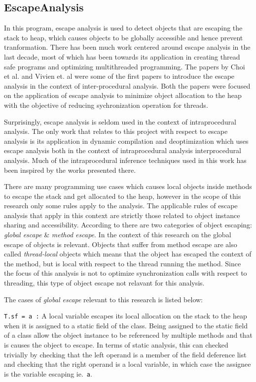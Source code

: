 \subsection{EscapeAnalysis}\label{sec:escape}
In this program, escape analysis is used to detect objects that are escaping the stack to heap, which causes objects to be globally accessible and hence prevent tranformation. There has been much work centered around escape analysis in the last decade, most of which has been towards its application in creating thread safe programs and optimizing multithreaded programming. The papers by Choi et al. and Vivien et. al \cite{ref:escapejava}\cite{ref:incrementalescape} were some of the first papers to introduce the escape analysis in the context of inter-procedural analysis. Both the papers were focused on the application of escape analysis to minimize object allocation to the heap with the objective of reducing sychronization operation for threads.

Surprisingly, escape analysis is seldom used in the context of intraprocedural analysis. The only work that relates to this project with respect to escape analysis is its application in dynamic compilation and deoptimization \cite{ref:kotzmann} which uses escape analysis both in the context of intraprocedural analysis interprocedural analysis. Much of the intraprocedural inference techniques used in this work has been inspired by the works presented there.

There are many programming use cases which causes local objects inside methods to escape the stack and get allocated to the heap, however in the scope of this research only some rules apply to the analysis. The applicable rules of escape analysis that apply in this context are strictly those related to object instance sharing and accessibility. According to \cite{ref:kotzmann} there are two categories of object escaping: \textit{global escape} \& \textit{method escape}. In the context of this research on the global escape of objects is relevant. Objects that suffer from method escape are also called \textit{thread-local} objects which means that the object has escaped the context of the method, but is local with respect to the thread running the method. Since the focus of this analysis is not to optimize synchronization calls with respect to threading, this type of object escape not relavant for this analysis.

The cases of \textit{global escape} relevant to this research is listed below:

\texttt{T.sf = a :} A local variable escapes its local allocation on the stack to the heap when it is assigned to a static field of the class. Being assigned to the static field of a class allow the object instance to be referenced by multiple methods and that is causes the object to escape. In terms of static analysis, this can checked trivially by checking that the left operand is a member of the field deference list and checking that the right operand is a local variable, in which case the assignee is the variable escaping ie.\ \texttt{a}.



